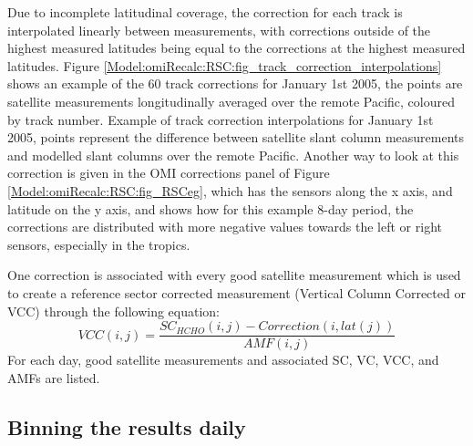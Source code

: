     Due to incomplete latitudinal coverage, the correction for each track is interpolated linearly between measurements, with corrections outside of the highest measured latitudes being equal to the corrections at the highest measured latitudes.
    Figure \ref{Model:omiRecalc:RSC:fig_track_correction_interpolations} shows an example of the 60 track corrections for January 1st 2005, the points are satellite measurements longitudinally averaged over the remote Pacific, coloured by track number.
      {Example of track correction interpolations for January 1st 2005, points represent the difference between satellite slant column measurements and modelled slant columns over the remote Pacific.}
      {\label{Model:omiRecalc:RSC:fig_track_correction_interpolations}}
    Another way to look at this correction is given in the OMI corrections panel of Figure \ref{Model:omiRecalc:RSC:fig_RSCeg}, which has the sensors along the x axis, and latitude on the y axis, and shows how for this example 8-day period, the corrections are distributed with more negative values towards the left or right sensors, especially in the tropics.
    
    One correction is associated with every good satellite measurement which is used to create a reference sector corrected measurement (Vertical Column Corrected or VCC) through the following equation:
    \begin{equation}
    VCC(i,j) = \frac{SC_{HCHO}(i,j) - Correction(i,lat(j))}{AMF(i,j)}
    \end{equation}
    For each day, good satellite measurements and associated SC, VC, VCC, and AMFs are listed.
  
  \subsection{Binning the results daily}
    
